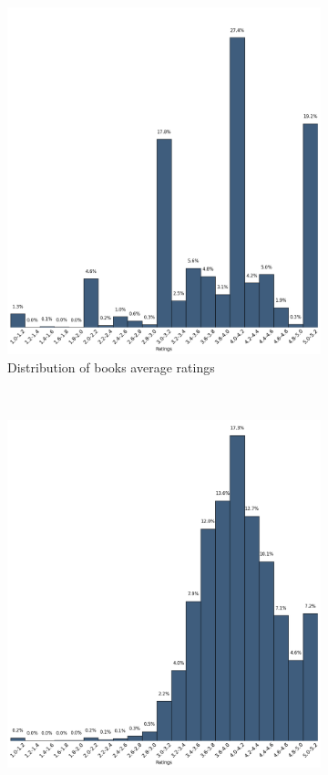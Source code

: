 \documentclass[11pt]{article}
\begin{document}
\begin{figure}
        \centering
        \begin{subfigure}[b]{0.5\textwidth}
                \includegraphics[width=\textwidth]{images/books_ratings}
                \caption{Distribution of books average ratings}
        \end{subfigure}%
        ~ %
        \begin{subfigure}[b]{0.5\textwidth}
                \includegraphics[width=\textwidth]{images/user_ratings}

\end{subfigure}
\end{figure}
\end{document}
